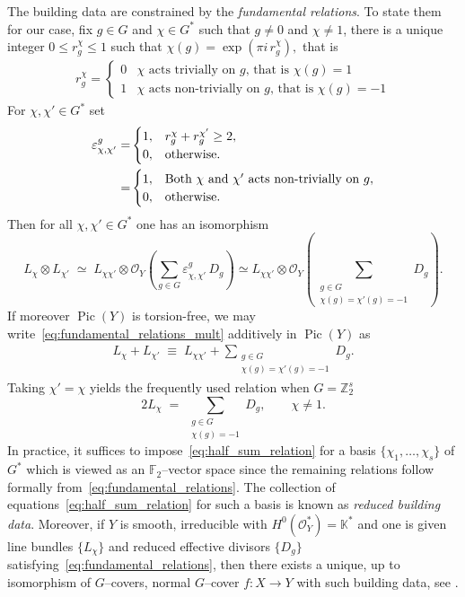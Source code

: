 \documentclass[12pt,twoside,]{amsart}
\theoremstyle{plain}
\theoremstyle{definition}
\newcommand{\Pic}{\operatorname{Pic}}
\newcommand{\OO}{\mathcal O}
\newcommand{\F}{\mathbb F}
\begin{document}
The building data are constrained by the \emph{fundamental relations}. 
To state them for our case, fix $g\in G$ and $\chi\in G^*$ such that $g \neq 0$ and $\chi \neq 1$, there is a unique integer
$0\le r_g^\chi\le 1$ such that \(\chi(g)=\exp\!\left(\pi i\,r_g^\chi\right), \) that is
\begin{align*}
r_g^{\chi} = 
\begin{cases}
 0 & \text{$\chi$ acts trivially on $g$, that is } \chi(g) = 1
 \\
 1 & \text{$\chi$ acts non-trivially on $g$, that is } \chi(g) = -1
\end{cases}
\end{align*}
For $\chi,\chi'\in G^*$ set
\begin{align*}
 \varepsilon^{g}_{\chi,\chi'}=
&
\begin{cases}
1,& r_g^\chi+r_g^{\chi'}\ge 2,\\
0,& \text{otherwise.}
\end{cases}   
\\
=
&\begin{cases}
1, &  \text{Both $\chi$ and \( \chi'\) acts non-trivially on } g,\\
0,& \text{otherwise.}
\end{cases}  
\end{align*}
Then for all $\chi,\chi'\in G^*$ one 
has an isomorphism
\begin{equation}\label{eq:fundamental_relations_mult}
L_\chi\otimes L_{\chi'} \;\simeq\;
L_{\chi\chi'}\otimes \OO_Y\!\left(\sum_{g\in G}\varepsilon^{g}_{\chi,\chi'}\,D_g\right)
\simeq
L_{\chi\chi'}\otimes \OO_Y\!\left(\sum_{\substack{g\in G\\ \chi(g)=\chi'(g)=-1}} D_g\right).
\end{equation}
If moreover $\Pic(Y)$ is torsion-free, we may write~\eqref{eq:fundamental_relations_mult} additively in $\Pic(Y)$ as
\begin{align}
\label{eq:fundamental_relations}
L_\chi+L_{\chi'} \;\equiv\; L_{\chi\chi'} + \sum_{\substack{g\in G\\ \chi(g)=\chi'(g)=-1}} D_g.
\end{align}
Taking $\chi'=\chi$ yields the frequently used relation when $G = \mathbb{Z}_2^s$
\begin{equation}\label{eq:half_sum_relation}
2L_\chi \;=\; \sum_{\substack{g\in G\\ \chi(g)=-1}} D_g,
\qquad \chi\neq 1.
\end{equation}
In practice, it suffices to impose~\eqref{eq:half_sum_relation} for a basis $\{\chi_1,\dots,\chi_s\}$ of $G^*$ which is viewed as an $\F_2$--vector space since the remaining relations follow formally from~\eqref{eq:fundamental_relations}.
The collection of equations~\eqref{eq:half_sum_relation} for such a basis is known as \emph{reduced building data}.
Moreover, if $Y$ is smooth, irreducible with $H^0(\mathcal{O}_Y^*) = \mathbb{K}^*$ and one is given line bundles $\{L_\chi\}$ and reduced effective divisors
$\{D_g\}$ satisfying~\eqref{eq:fundamental_relations}, then there exists a unique, up to isomorphism of $G$--covers, normal $G$--cover $f\colon X\to Y$ with such building data, see \cite[Proposition $2.1$]{pardini1991abelian}. 
\end{document}
